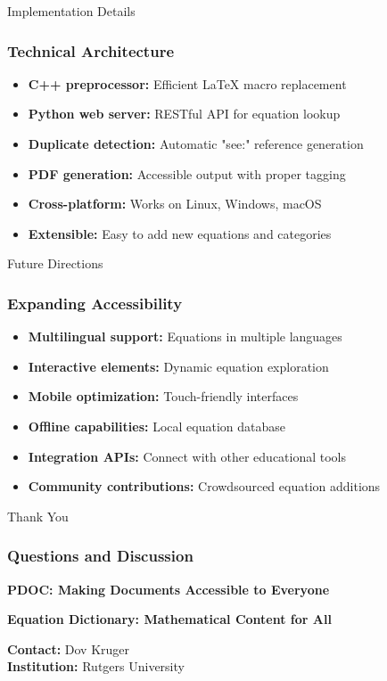 \documentclass[aspectratio=169]{beamer}
\begin{document}
\begin{frame}[fragile]{Implementation Details}
\frametitle{Technical Architecture}
\begin{itemize}
\item \textbf{C++ preprocessor:} Efficient LaTeX macro replacement
\item \textbf{Python web server:} RESTful API for equation lookup
\item \textbf{Duplicate detection:} Automatic "see:" reference generation
\item \textbf{PDF generation:} Accessible output with proper tagging
\item \textbf{Cross-platform:} Works on Linux, Windows, macOS
\item \textbf{Extensible:} Easy to add new equations and categories
\end{itemize}
\end{frame}

\begin{frame}[fragile]{Future Directions}
\frametitle{Expanding Accessibility}
\begin{itemize}
\item \textbf{Multilingual support:} Equations in multiple languages
\item \textbf{Interactive elements:} Dynamic equation exploration
\item \textbf{Mobile optimization:} Touch-friendly interfaces
\item \textbf{Offline capabilities:} Local equation database
\item \textbf{Integration APIs:} Connect with other educational tools
\item \textbf{Community contributions:} Crowdsourced equation additions
\end{itemize}
\end{frame}

\begin{frame}[fragile]{Thank You}
\frametitle{Questions and Discussion}
\begin{center}
\textbf{PDOC: Making Documents Accessible to Everyone}

\vspace{1em}
\textbf{Equation Dictionary: Mathematical Content for All}

\vspace{2em}
\textbf{Contact:} Dov Kruger\\
\textbf{Institution:} Rutgers University
\end{center}
\end{frame}
\end{document}
